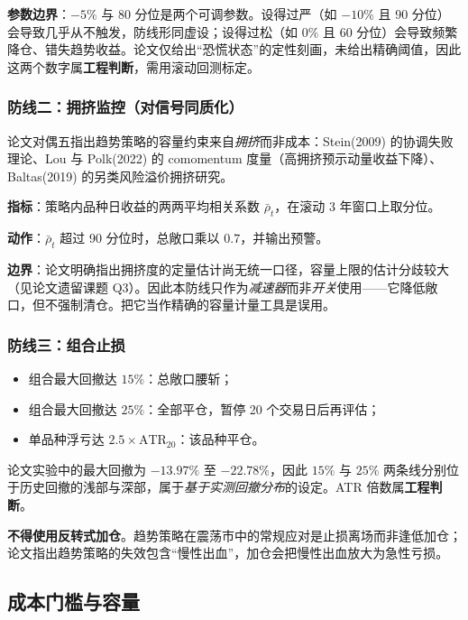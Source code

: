\textbf{参数边界}：$-5\%$ 与 80 分位是两个可调参数。设得过严（如 $-10\%$ 且 90 分位）会导致几乎从不触发，防线形同虚设；设得过松（如 $0\%$ 且 60 分位）会导致频繁降仓、错失趋势收益。论文仅给出“恐慌状态”的定性刻画，未给出精确阈值，因此这两个数字属\textbf{工程判断}，需用滚动回测标定。

\subsubsection*{防线二：拥挤监控（对信号同质化）}

论文对偶五指出趋势策略的容量约束来自\emph{拥挤}而非成本：Stein(2009) 的协调失败理论\cite{stein2009}、Lou 与 Polk(2022) 的 comomentum 度量（高拥挤预示动量收益下降）\cite{loupolk2022}、Baltas(2019) 的另类风险溢价拥挤研究\cite{baltas2019}。

\textbf{指标}：策略内品种日收益的两两平均相关系数 $\bar\rho_t$，在滚动 3 年窗口上取分位。

\textbf{动作}：$\bar\rho_t$ 超过 90 分位时，总敞口乘以 $0.7$，并输出预警。

\textbf{边界}：论文明确指出拥挤度的定量估计尚无统一口径，容量上限的估计分歧较大（见论文遗留课题 Q3）。因此本防线只作为\emph{减速器}而非\emph{开关}使用——它降低敞口，但不强制清仓。把它当作精确的容量计量工具是误用。

\subsubsection*{防线三：组合止损}

\begin{itemize}[leftmargin=2.2em]
  \item 组合最大回撤达 $15\%$：总敞口腰斩；
  \item 组合最大回撤达 $25\%$：全部平仓，暂停 20 个交易日后再评估；
  \item 单品种浮亏达 $2.5\times\text{ATR}_{20}$：该品种平仓。
\end{itemize}

论文实验中的最大回撤为 $-13.97\%$ 至 $-22.78\%$，因此 $15\%$ 与 $25\%$ 两条线分别位于历史回撤的浅部与深部，属于\emph{基于实测回撤分布}的设定。ATR 倍数属\textbf{工程判断}。

\textbf{不得使用反转式加仓}。趋势策略在震荡市中的常规应对是止损离场而非逢低加仓；论文指出趋势策略的失效包含“慢性出血”，加仓会把慢性出血放大为急性亏损。

\subsection{成本门槛与容量}

